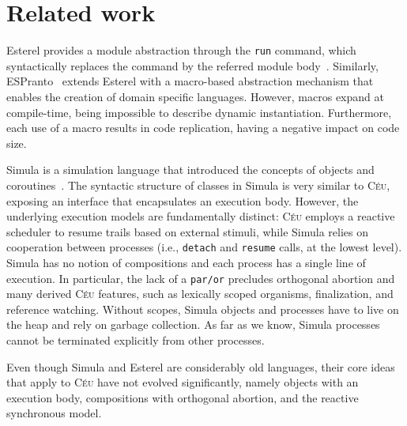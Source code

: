\documentclass{acm_proc_article-sp}
\newcommand{\CEU}{\textsc{C\'{e}u}\xspace}
\newcommand{\code}[1] {{\small{\texttt{#1}}}}
\newcommand{\1}{\;}
\newcommand{\2}{\;\;}
\newcommand{\3}{\;\;\;}
\newcommand{\5}{\;\;\;\;\;}
\begin{document}
\section{Related work}
\label{sec.related}

Esterel provides a module abstraction through the \code{run} command, which 
syntactically replaces the command by the referred module 
body~\cite{esterel.primer}.
%
Similarly, ESPranto~\cite{espranto} extends Esterel with a macro-based 
abstraction mechanism that enables the creation of domain specific languages.
%
However, macros expand at compile-time, being impossible to describe dynamic 
instantiation.
Furthermore, each use of a macro results in code replication, having a negative 
impact on code size.

Simula is a simulation language that introduced the concepts of objects and 
coroutines~\cite{simula}.
%
The syntactic structure of classes in Simula is very similar to \CEU, exposing 
an interface that encapsulates an execution body.
%
However, the underlying execution models are fundamentally distinct:
\CEU employs a reactive scheduler to resume trails based on external stimuli, 
while Simula relies on cooperation between processes (i.e., \code{detach} and 
\code{resume} calls, at the lowest level).
%
Simula has no notion of compositions and each process has a single line of 
execution.
In particular, the lack of a \code{par/or} precludes orthogonal abortion and 
many derived \CEU features, such as lexically scoped organisms, finalization, 
and reference watching.
%
Without scopes, Simula objects and processes have to live on the heap and rely 
on garbage collection.
As far as we know, Simula processes cannot be terminated explicitly from other 
processes.
%

Even though Simula and Esterel are considerably old languages, their core ideas 
that apply to \CEU have not evolved significantly, namely objects with an 
execution body, compositions with orthogonal abortion, and the reactive 
synchronous model.

\end{document}
